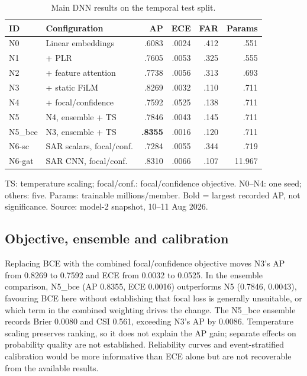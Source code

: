 \documentclass[conference]{IEEEtran}
\newcommand{\bce}{N5\_bce}
\begin{document}
\begin{table}[t]
\caption{Main DNN results on the temporal test split.}
\label{tab:ablation}
\centering\footnotesize
\begin{tabular}{@{}llrrrr@{}}
\toprule
ID & Configuration & AP & ECE & FAR & Params \\
\midrule
N0 & Linear embeddings & .6083 & .0024 & .412 & .551 \\
N1 & + PLR & .7605 & .0053 & .325 & .555 \\
N2 & + feature attention & .7738 & .0056 & .313 & .693 \\
N3 & + static FiLM & .8269 & .0032 & .110 & .711 \\
N4 & + focal/confidence & .7592 & .0525 & .138 & .711 \\
N5 & N4, ensemble + TS & .7846 & .0043 & .145 & .711 \\
\bce{} & N3, ensemble + TS & \textbf{.8355} & .0016 & .120 & .711 \\
\midrule
N6-sc & SAR scalars, focal/conf. & .7284 & .0055 & .344 & .719 \\
N6-gat & SAR CNN, focal/conf. & .8310 & .0066 & .107 & 11.967 \\
\bottomrule

\end{tabular}\par
\vspace{4pt}
\noindent
\parbox[t]{\columnwidth}{%
  \scriptsize\raggedright
  TS: temperature scaling; focal/conf.: focal/confidence objective.
  N0--N4: one seed;
  others: five. Params: trainable millions/member.
  Bold = largest recorded AP, not significance.
  Source: model-2 snapshot, 10--11 Aug 2026.
}
\end{table}

\subsection{Objective, ensemble and calibration}
Replacing BCE with the combined focal/confidence objective moves N3's AP
from 0.8269 to 0.7592 and ECE from 0.0032 to 0.0525. In the ensemble
comparison, \bce{} (AP 0.8355, ECE 0.0016) outperforms N5 (0.7846, 0.0043),
favouring BCE here without establishing that focal loss is generally
unsuitable, or which term in the combined weighting drives the change. The
\bce{} ensemble records Brier 0.0080 and CSI 0.561, exceeding N3's AP by
0.0086. Temperature scaling preserves ranking, so it does not explain
the AP gain; separate effects on probability quality are not established. Reliability
curves and event-stratified calibration would be more informative than ECE
alone but are not recoverable from the available results.
\end{document}
